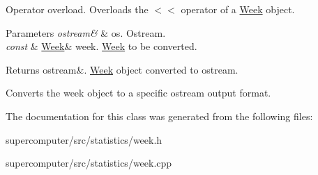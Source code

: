 Operator overload. Overloads the $<$$<$ operator of a \hyperlink{classWeek}{Week} object. 


\begin{DoxyParams}{Parameters}
{\em ostream\&} & os. Ostream. \\
\hline
{\em const} & \hyperlink{classWeek}{Week}\& week. \hyperlink{classWeek}{Week} to be converted. \\
\hline
\end{DoxyParams}
\begin{DoxyReturn}{Returns}
ostream\&. \hyperlink{classWeek}{Week} object converted to ostream.
\end{DoxyReturn}
Converts the week object to a specific ostream output format. 

The documentation for this class was generated from the following files\+:\begin{DoxyCompactItemize}
\item 
supercomputer/src/statistics/week.\+h\item 
supercomputer/src/statistics/week.\+cpp\end{DoxyCompactItemize}
